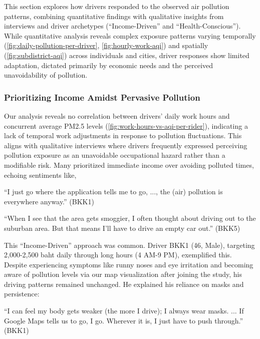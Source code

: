 \documentclass[sigconf,screen,natbib=true]{acmart}
\begin{document}
This section explores how drivers responded to the observed air pollution patterns, combining quantitative findings with qualitative insights from interviews and driver archetypes (``Income-Driven'' and ``Health-Conscious'').
While quantitative analysis reveals complex exposure patterns varying temporally (\autoref{fig:daily-pollution-per-driver}, \autoref{fig:hourly-work-aqi}) and spatially (\autoref{fig:subdistrict-aqi}) across individuals and cities,
driver responses show limited adaptation, dictated primarily by economic needs and the perceived unavoidability of pollution.

\subsubsection{Prioritizing Income Amidst Pervasive Pollution}
Our analysis reveals no correlation between drivers' daily work hours and concurrent average PM2.5 levels (\autoref{fig:work-hours-vs-aqi-per-rider}), indicating a lack of temporal work adjustments in response to pollution fluctuations.
This aligns with qualitative interviews where drivers frequently expressed perceiving pollution exposure as an unavoidable occupational hazard rather than a modifiable risk.
Many prioritized immediate income over avoiding polluted times, echoing sentiments like,

\begin{quoteb}
    ``I just go where the application tells me to go, ..., the (air) pollution is everywhere anyway.'' (BKK1)
\end{quoteb}

\begin{quoteb}
    ``When I see that the area gets smoggier, I often thought about driving out to the suburban area. But that means I'll have to drive an empty car out.'' (BKK5)
\end{quoteb}

This ``Income-Driven'' approach was common.
Driver BKK1 (46, Male), targeting 2,000-2,500 baht daily through long hours (4 AM-9 PM), exemplified this.
Despite experiencing symptoms like runny noses and eye irritation and becoming aware of pollution levels via our map visualization after joining the study, his driving patterns remained unchanged.
He explained his reliance on masks and persistence:

\begin{quoteb}
    ``I can feel my body gets weaker (the more I drive); I always wear masks. ... If Google Maps tells us to go, I go. Wherever it is, I just have to push through.'' (BKK1)
\end{quoteb}
\end{document}
